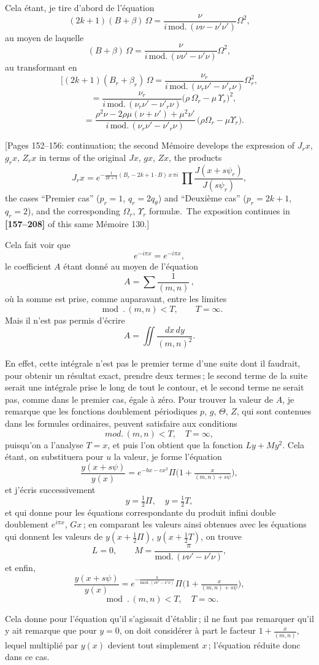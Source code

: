 \documentclass[11pt,a4paper]{article}
\theoremstyle{definition}
\begin{document}
\medskip

Cela \'etant, je tire d'abord de l'\'equation
\[
(2k+1)(B+\beta)\,\Omega = \frac{\nu}{i\,\text{mod.}\,(\nu\nu - \nu'\nu')}\Omega^2,
\]
au moyen de laquelle
\[
(B+\beta)\,\Omega = \frac{\nu}{i\,\text{mod.}\,(\nu\nu' - \nu'\nu)}\Omega^2,
\]
au transformant en
\[
[(2k+1)(B_r+\beta_r)\,\Omega = \frac{\nu_r}{i\,\text{mod.}\,(\nu_r\nu' - \nu'_r\nu)}\Omega_r^2,
\]
\[
\quad= \frac{\nu_r}{i\,\text{mod.}\,(\nu_r\nu' - \nu'_r\nu)}\bigl(\rho\,\Omega_r - \mu\,\Upsilon_r\bigr)^2,
\]
\[
\quad= \frac{\rho^2\nu - 2\rho\mu(\nu+\nu') + \mu^2\nu'}{i\,\text{mod.}\,(\nu_r\nu' - \nu'_r\nu)}\,\bigl(\rho\Omega_r - \mu\Upsilon_r\bigr).
\]

\medskip

[Pages 152--156: continuation; the second M\'emoire develops the
expression of $J_r x$, $g_r x$, $Z_r x$ in terms of the original
$J x$, $g x$, $Z x$, the products
\[
J_r x = e^{-\frac{1}{2k+1}(B_r - 2k+1 \cdot B)\,x\,\pi i}\,
\prod \frac{J(x + s\psi_r)}{J(s\psi_r)},
\]
the cases ``Premier cas'' ($p_r=1$, $q_r=2 q_\theta$) and
``Deuxi\`eme cas'' ($p_r = 2k+1$, $q_r = 2$), and the corresponding
$\Omega_r$, $\Upsilon_r$ formul\ae.\ The exposition continues in
\textbf{[157--208]} of this same M\'emoire 130.]

\medskip

Cela fait voir que
\[
e^{-i\pi x} = e^{-i\pi x},
\]
le coefficient $A$ \'etant donn\'e au moyen de l'\'equation
\[
A = \sum \frac{1}{(m, n)}\,,
\]
o\`u la somme est prise, comme auparavant, entre les limites
\[
\mod.\,(m, n) < T, \qquad T = \infty.
\]
Mais il n'est pas permis d'\'ecrire
\[
A = \iint \frac{dx\,dy}{(m, n)^2}.
\]

\medskip

En effet, cette int\'egrale n'est pas le premier terme d'une suite dont il faudrait,
pour obtenir un r\'esultat exact, prendre deux termes\,; le second terme de la suite serait
une int\'egrale prise le long de tout le contour, et le second terme ne serait pas, comme
dans le premier cas, \'egale \`a z\'ero. Pour trouver la valeur de $A$, je remarque que les
fonctions doublement p\'eriodiques $p$, $g$, $\Theta$, $Z$, qui sont contenues dans les formules
ordinaires, peuvent satisfaire aux conditions
\[
mod.\,(m,n) < T,\quad T = \infty,
\]
puisqu'on a l'analyse $T = x$, et puis l'on obtient que la fonction $L y + M y^2$. Cela
\'etant, on substituera pour $u$ la valeur, je forme l'\'equation
\[
\frac{y(x+s\psi)}{y(x)} = e^{-bx-cx^2}\Pi\bigl(1+\tfrac{x}{(m,n)+s\psi}\bigr),
\]
et j'\'ecris successivement
\[
y = \tfrac{1}{2}\Pi,\quad y = \tfrac{1}{2}T,
\]
et qui donne pour les \'equations correspondante du produit infini double doublement
$e^{i\pi x}$, $G x$\,; en comparant les valeurs ainsi obtenues avec les \'equations qui donnent les
valeurs de $y(x+\tfrac{1}{2}\Pi)$, $y(x+\tfrac{1}{2}T)$, on trouve
\[
L = 0,\qquad M = \frac{\pi}{\text{mod.}\,(\nu\nu' - \nu'\nu)},
\]
et enfin,
\[
\frac{y(x+s\psi)}{y(x)} = e^{-\frac{\pi}{\text{mod.}\,(\nu\nu' - \nu'\nu)}}\Pi\bigl(1+\tfrac{x}{(m,n)+s\psi}\bigr),
\]
\[
\mod.\,(m, n)<T,\quad T = \infty.
\]

\medskip

Cela donne pour l'\'equation qu'il s'agissait d'\'etablir\,; il ne faut pas remarquer qu'il y
ait remarque que pour $y = 0$, on doit consid\'erer \`a part le facteur $1+\tfrac{x}{(m,n)}$, lequel
multipli\'e par $y(x)$ devient tout simplement $x$\,; l'\'equation r\'eduite donc dans ce cas.
\end{document}

